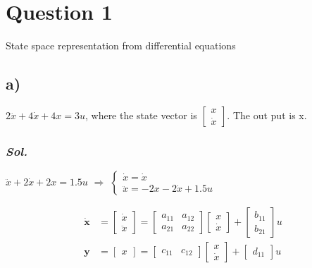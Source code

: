 \section{Question 1}
    State space representation from differential equations

    \subsection{a)} 
    $2\ddot{x} + 4\dot{x} + 4x=3u$, where the state vector is 
    $\begin{bmatrix}
        x \\
        \dot{x}
    \end{bmatrix}$.
    The out put is x.
    \subsubsection{\textit{ Sol. }}
    $\ddot{x} + 2\dot{x} + 2x=1.5u$ $\Rightarrow$ 
    $\left\{
        \begin{array}{lr}
        \dot{x} = \dot{x} \\
        \ddot{x} = -2x -2\dot{x} + 1.5u
        \end{array}
    \right.$

    \begin{align}
        \dot{\textbf{x}} &=
        \begin{bmatrix}
            \dot{x} \\
            \ddot{x}
        \end{bmatrix} = 
        \begin{bmatrix}
            a_{11} & a_{12} \\
            a_{21} & a_{22}
        \end{bmatrix}
        \begin{bmatrix}
            x \\
            \dot{x}
        \end{bmatrix} + 
        \begin{bmatrix}
            b_{11}\\
            b_{21}
        \end{bmatrix}
        u
        \\
        \textbf{y} &=
        \begin{bmatrix}
            x
        \end{bmatrix} =
        \begin{bmatrix}
            c_{11} & c_{12}
        \end{bmatrix}
        \begin{bmatrix}
            x \\
            \dot{x}
        \end{bmatrix} + 
        \begin{bmatrix}
            d_{11}
        \end{bmatrix}
        u
    \end{align}


